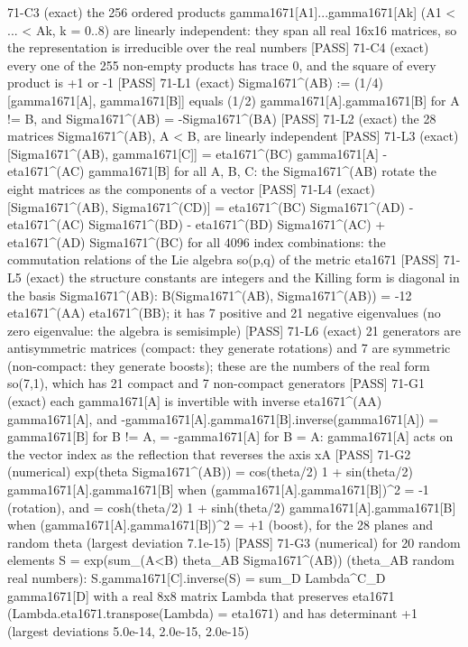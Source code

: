 \documentclass[
  10pt,
]{article}
\newenvironment{Shaded}{}{}
\newcommand{\NormalTok}[1]{#1}
\begin{document}
\begin{Shaded}
\begin{Highlighting}[]
\NormalTok{[PASS] 71{-}C3  (exact) the 256 ordered products gamma1671[A1]...gamma1671[Ak] (A1 \textless{} ... \textless{} Ak, k = 0..8) are linearly independent: they span all real 16x16 matrices, so the representation is irreducible over the real numbers}
\NormalTok{[PASS] 71{-}C4  (exact) every one of the 255 non{-}empty products has trace 0, and the square of every product is +1 or {-}1}
\NormalTok{[PASS] 71{-}L1  (exact) Sigma1671\^{}(AB) := (1/4)[gamma1671[A], gamma1671[B]] equals (1/2) gamma1671[A].gamma1671[B] for A != B, and Sigma1671\^{}(AB) = {-}Sigma1671\^{}(BA)}
\NormalTok{[PASS] 71{-}L2  (exact) the 28 matrices Sigma1671\^{}(AB), A \textless{} B, are linearly independent}
\NormalTok{[PASS] 71{-}L3  (exact) [Sigma1671\^{}(AB), gamma1671[C]] = eta1671\^{}(BC) gamma1671[A] {-} eta1671\^{}(AC) gamma1671[B] for all A, B, C: the Sigma1671\^{}(AB) rotate the eight matrices as the components of a vector}
\NormalTok{[PASS] 71{-}L4  (exact) [Sigma1671\^{}(AB), Sigma1671\^{}(CD)] = eta1671\^{}(BC) Sigma1671\^{}(AD) {-} eta1671\^{}(AC) Sigma1671\^{}(BD) {-} eta1671\^{}(BD) Sigma1671\^{}(AC) + eta1671\^{}(AD) Sigma1671\^{}(BC) for all 4096 index combinations: the commutation relations of the Lie algebra so(p,q) of the metric eta1671}
\NormalTok{[PASS] 71{-}L5  (exact) the structure constants are integers and the Killing form is diagonal in the basis Sigma1671\^{}(AB): B(Sigma1671\^{}(AB), Sigma1671\^{}(AB)) = {-}12 eta1671\^{}(AA) eta1671\^{}(BB); it has 7 positive and 21 negative eigenvalues (no zero eigenvalue: the algebra is semisimple)}
\NormalTok{[PASS] 71{-}L6  (exact) 21 generators are antisymmetric matrices (compact: they generate rotations) and 7 are symmetric (non{-}compact: they generate boosts); these are the numbers of the real form so(7,1), which has 21 compact and 7 non{-}compact generators}
\NormalTok{[PASS] 71{-}G1  (exact) each gamma1671[A] is invertible with inverse eta1671\^{}(AA) gamma1671[A], and {-}gamma1671[A].gamma1671[B].inverse(gamma1671[A]) = gamma1671[B] for B != A, = {-}gamma1671[A] for B = A: gamma1671[A] acts on the vector index as the reflection that reverses the axis xA}
\NormalTok{[PASS] 71{-}G2  (numerical) exp(theta Sigma1671\^{}(AB)) = cos(theta/2) 1 + sin(theta/2) gamma1671[A].gamma1671[B] when (gamma1671[A].gamma1671[B])\^{}2 = {-}1 (rotation), and = cosh(theta/2) 1 + sinh(theta/2) gamma1671[A].gamma1671[B] when (gamma1671[A].gamma1671[B])\^{}2 = +1 (boost), for the 28 planes and random theta (largest deviation 7.1e{-}15)}
\NormalTok{[PASS] 71{-}G3  (numerical) for 20 random elements S = exp(sum\_(A\textless{}B) theta\_AB Sigma1671\^{}(AB)) (theta\_AB random real numbers):  S.gamma1671[C].inverse(S) = sum\_D Lambda\^{}C\_D gamma1671[D] with a real 8x8 matrix Lambda that preserves eta1671 (Lambda.eta1671.transpose(Lambda) = eta1671) and has determinant +1 (largest deviations 5.0e{-}14, 2.0e{-}15, 2.0e{-}15)}

\end{Highlighting}
\end{Shaded}
\end{document}

